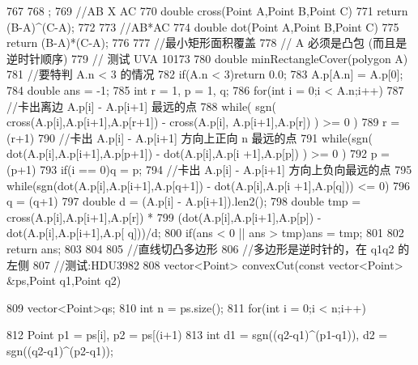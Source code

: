 \documentclass[11pt]{article}
\begin{document}
\begin{Code}
{{767       }
768   };
769   //AB X AC
770   double cross(Point A,Point B,Point C){
771       return (B-A)^(C-A);
772   }
773   //AB*AC
774   double dot(Point A,Point B,Point C){
775       return (B-A)*(C-A);
776   }
777   //最小矩形面积覆盖
778   // A 必须是凸包 (而且是逆时针顺序)
779   // 测试 UVA 10173
780   double minRectangleCover(polygon A){
781       //要特判 A.n < 3 的情况
782       if(A.n < 3)return 0.0;
783       A.p[A.n] = A.p[0];
784       double ans = -1;
785       int r = 1, p = 1, q;
786       for(int i = 0;i < A.n;i++){
787           //卡出离边 A.p[i] - A.p[i+1] 最远的点
788           while( sgn( cross(A.p[i],A.p[i+1],A.p[r+1]) - cross(A.p[i],
                 A.p[i+1],A.p[r]) ) >= 0 )
789               r = (r+1)%
790           //卡出 A.p[i] - A.p[i+1] 方向上正向 n 最远的点
791           while(sgn( dot(A.p[i],A.p[i+1],A.p[p+1]) - dot(A.p[i],A.p[i
                 +1],A.p[p]) ) >= 0 )
792               p = (p+1)%
793           if(i == 0)q = p;
794           //卡出 A.p[i] - A.p[i+1] 方向上负向最远的点
795           while(sgn(dot(A.p[i],A.p[i+1],A.p[q+1]) - dot(A.p[i],A.p[i
                 +1],A.p[q])) <= 0)
796               q = (q+1)%
797           double d = (A.p[i] - A.p[i+1]).len2();
798           double tmp = cross(A.p[i],A.p[i+1],A.p[r]) *
799               (dot(A.p[i],A.p[i+1],A.p[p]) - dot(A.p[i],A.p[i+1],A.p[
                     q]))/d;
800           if(ans < 0 || ans > tmp)ans = tmp;
801       }
802       return ans;
803   }
804
805   //直线切凸多边形
806   //多边形是逆时针的，在 q1q2 的左侧
807   //测试:HDU3982
808   vector<Point> convexCut(const vector<Point> &ps,Point q1,Point q2){
809       vector<Point>qs;
810       int n = ps.size();
811       for(int i = 0;i < n;i++){
812           Point p1 = ps[i], p2 = ps[(i+1)%
813           int d1 = sgn((q2-q1)^(p1-q1)), d2 = sgn((q2-q1)^(p2-q1));


}}
\end{Code}
\end{document}
